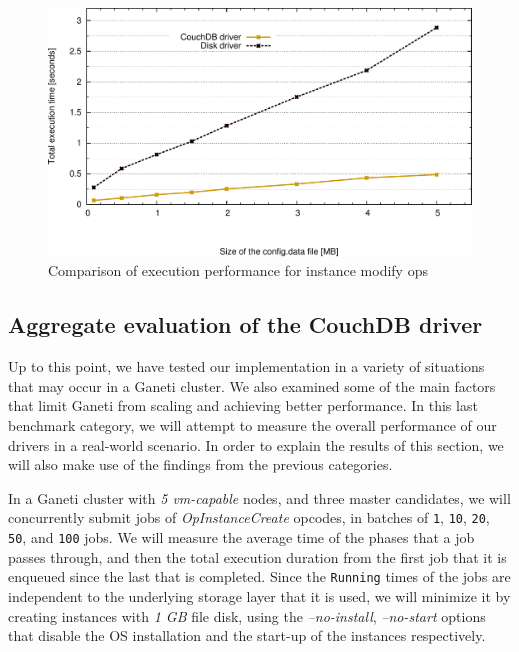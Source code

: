 \begin{figure}[htbp]
  \begin{center}
    \includegraphics[width=1.0\maxwidth]{../figures/comp-cfg.pdf}
    \caption{Comparison of execution performance for instance modify ops}
    \label{fig:comp-cfg}
  \end{center}
\end{figure}

\subsection{Aggregate evaluation of the CouchDB driver}\label{subsec:total_eval}

Up to this point, we have tested our implementation in a variety of situations
that may occur in a Ganeti cluster. We also examined some of the main factors
that limit Ganeti from scaling and achieving better performance. In this last
benchmark category, we will attempt to measure the overall performance of
our drivers in a real-world scenario. In order to explain the results of this
section, we will also make use of the findings from the previous categories.

In a Ganeti cluster with \emph{5 vm-capable} nodes, and three master candidates,
we will concurrently submit jobs of \emph{OpInstanceCreate} opcodes, in batches
of \texttt{1}, \texttt{10}, \texttt{20}, \texttt{50}, and \texttt{100} jobs. We
will measure the average time of the phases that a job passes through, and then
the total execution duration from the first job that it is enqueued since the
last that is completed. Since the \texttt{Running} times of the jobs are
independent to the underlying storage layer that it is used, we will minimize
it by creating instances with \emph{1 GB} file disk, using the
\emph{--no-install}, \emph{--no-start} options that disable the OS installation
and the start-up of the instances respectively.

